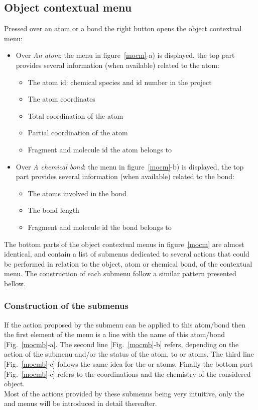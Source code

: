 \subsection{Object contextual menu}
\label{mobjm}
Pressed over an atom or a bond the right button opens the object contextual menu: 
\ocmfig
\vspace{-0.125cm}
\begin{itemize}
\item Over {\em{An atom}}: the menu in figure~\ref{mocm}-a) is displayed, the top part provides several information (when available) related to the atom:
\begin{itemize}
\item The atom id: chemical species and id number in the project
\item The atom coordinates
\item Total coordination of the atom
\item Partial coordination of the atom
\item Fragment and molecule id the atom belongs to
\end{itemize}
\item Over {\em{A chemical bond}}: the menu in figure~\ref{mocm}-b) is displayed, the top part provides several information (when available) related to the bond:
\begin{itemize}
\item The atoms involved in the bond
\item The bond length
\item Fragment and molecule id the bond belongs to
\end{itemize}
\end{itemize}
The bottom parts of the object contextual menus in figure~\ref{mocm} are almost identical, 
and contain a list of submenus dedicated to several actions that could be performed in relation to the object, 
atom or chemical bond, of the contextual menu. 
The construction of each submenu follow a similar pattern presented bellow. 
\subsubsection*{Construction of the submenus}
\label{mocmcons}
\csosfig
If the action proposed by the submenu can be applied to this atom/bond then the first element of the menu
is a line with the name of this atom/bond [Fig.~\ref{mocmb}-a]. 
The second line [Fig.~\ref{mocmb}-b] refers, depending on the action of the submenu and/or the status of the atom, to  or  atoms.  
The third line [Fig.~\ref{mocmb}-c] follows the same idea for the  or  atoms. 
Finally the bottom part [Fig.~\ref{mocmb}-c] refers to the coordinations and the chemistry of the considered object. \\
Most of the actions provided by these submenus being very intuitive, only the  and  menus will be introduced in detail thereafter. 

